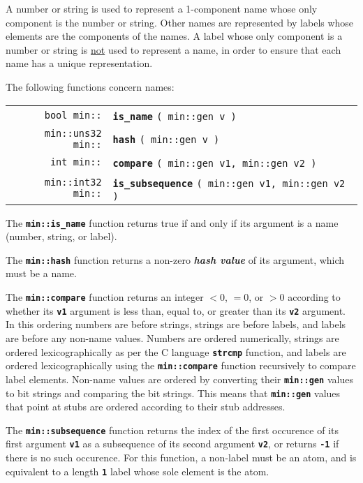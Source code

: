 \documentclass[12pt]{article}
\makeatletter
\newcommand{\TT}[1]{{\tt \bfseries #1}}
\newcommand{\key}[1]{{\bf \em #1}\index{#1}}
\newcommand{\ttindex}[1]{\index{#1@{\tt #1}}}
\newcommand{\EOL}{\penalty \exhyphenpenalty}
\newenvironment{indpar}[1][0.3in]%
	{\begin{list}{}%
		     {\setlength{\itemsep}{0in}%
		      \setlength{\topsep}{0in}%
		      \setlength{\parsep}{1ex}%
		      \setlength{\labelwidth}{#1}%
		      \setlength{\leftmargin}{#1}%
		      \addtolength{\leftmargin}{\labelsep}}%
	 \item}%
	{\end{list}}
\newcommand{\LABEL}[1]{\label{#1}}
\newcommand{\MINKEY}[1]%
	   {\TT{#1}\ttindex{min::#1}\ttindex{#1}}
\makeatother
\begin{document}
A number or string is used to represent a 1-component name whose
only component is the number or string.  Other names are represented
by labels whose elements are the components of the names.  A label whose
only component is a number or string is \underline{not}
used to represent a name, in order to ensure that each name has a unique
representation.

The following functions concern names:

\begin{indpar}\begin{tabular}{r@{}l}
\verb|bool min::| & \MINKEY{is\_name} \verb|( min::gen v )|
\LABEL{MIN::IS_NAME} \\
\verb|min::uns32 min::| & \MINKEY{hash} \verb|( min::gen v )|
\LABEL{MIN::HASH} \\
\verb|int min::| & \MINKEY{compare} \verb|( min::gen v1, min::gen v2 )|
\LABEL{MIN::COMPARE} \\
\verb|min::int32 min::| & \MINKEY{is\_subsequence}
    \verb|( min::gen v1, min::gen v2 )|
\LABEL{MIN::IS_SUBSEQUENCE} \\
\end{tabular}\end{indpar}

The \TT{min::is\_name} function returns true if and only if its argument is
a name (number, string, or label).

The \TT{min::hash} function returns a non-zero
\key{hash value}\label{HASH-VALUE} of its argument, which must be
a name.

The \TT{min::compare} function returns an integer $<0$, $=0$, or $>0$
according to whether its \TT{v1} argument is less than, equal to, or
greater than its \TT{v2} argument.
In this ordering numbers are
before strings, strings are before labels, and labels are before
any non-name values.  Numbers are ordered
numerically, strings are ordered lexicographically as per the
C language \TT{strcmp} function, and labels are ordered lexicographically
using the \TT{min::\EOL compare} function recursively to compare
label elements.  Non-name values are ordered by converting their
\TT{min::gen} values to bit strings and comparing the bit strings.
This means that \TT{min::gen} values that point at stubs are ordered
according to their stub addresses.

The \TT{min::subsequence} function
returns the index of the first occurence
of its first argument \TT{v1} as a subsequence of its second
argument \TT{v2}, or returns \TT{-1} if there is no such
occurence.  For this function,
a non-label must be an atom, and is equivalent to a length \TT{1} label
whose sole element is the atom.
\end{document}
